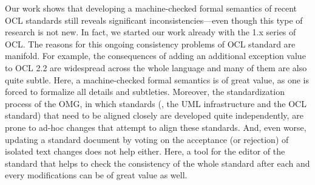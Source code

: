Our work shows that developing a machine-checked formal semantics of
recent {OCL} standards still reveals significant
inconsistencies---even though this type of research is not new. In
fact, we started our work already with the 1.x series of {OCL}. The
reasons for this ongoing consistency problems of {OCL} standard are
manifold. For example, the consequences of adding an additional
exception value to OCL 2.2 are widespread across the whole language
and many of them are also quite subtle. Here, a machine-checked formal
semantics is of great value, as one is forced to formalize all details
and subtleties.  Moreover, the standardization process of the {OMG},
in which standards (\eg, the {UML} infrastructure and the {OCL}
standard) that need to be aligned closely are developed quite
independently, are prone to ad-hoc changes that attempt to align these
standards. And, even worse, updating a standard document by voting on
the acceptance (or rejection) of isolated text changes does not help
either. Here, a tool for the editor of the standard that helps to
check the consistency of the whole standard after each and every
modifications can be of great value as well.



